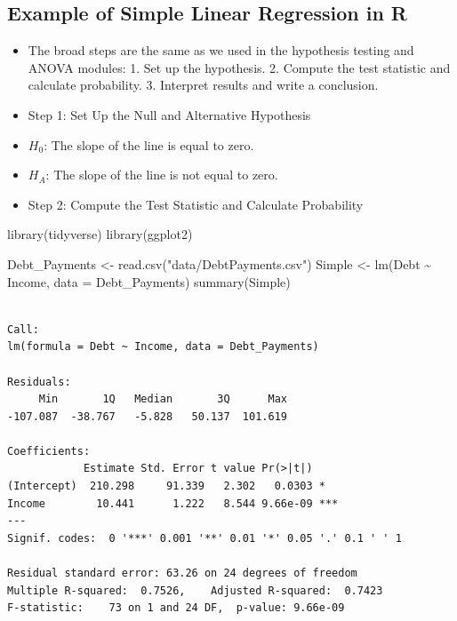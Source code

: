 \documentclass[
  letterpaper,
  DIV=11,
  numbers=noendperiod]{scrreprt}
\newenvironment{Shaded}{\begin{snugshade}}{\end{snugshade}}
\newcommand{\AttributeTok}[1]{\textcolor[rgb]{0.40,0.45,0.13}{#1}}
\newcommand{\FunctionTok}[1]{\textcolor[rgb]{0.28,0.35,0.67}{#1}}
\newcommand{\NormalTok}[1]{\textcolor[rgb]{0.00,0.23,0.31}{#1}}
\newcommand{\OtherTok}[1]{\textcolor[rgb]{0.00,0.23,0.31}{#1}}
\newcommand{\SpecialCharTok}[1]{\textcolor[rgb]{0.37,0.37,0.37}{#1}}
\newcommand{\StringTok}[1]{\textcolor[rgb]{0.13,0.47,0.30}{#1}}
\begin{document}
\subsection{Example of Simple Linear Regression in
R}\label{example-of-simple-linear-regression-in-r}

\begin{itemize}
\item
  The broad steps are the same as we used in the hypothesis testing and
  ANOVA modules: 1. Set up the hypothesis. 2. Compute the test statistic
  and calculate probability. 3. Interpret results and write a
  conclusion.
\item
  Step 1: Set Up the Null and Alternative Hypothesis
\item
  \(H_0\): The slope of the line is equal to zero.
\item
  \(H_A\): The slope of the line is not equal to zero.
\item
  Step 2: Compute the Test Statistic and Calculate Probability
\end{itemize}

\begin{Shaded}
\begin{Highlighting}[]
\FunctionTok{library}\NormalTok{(tidyverse)}
\FunctionTok{library}\NormalTok{(ggplot2)}
\end{Highlighting}
\end{Shaded}

\begin{Shaded}
\begin{Highlighting}[]
\NormalTok{Debt\_Payments }\OtherTok{\textless{}{-}} \FunctionTok{read.csv}\NormalTok{(}\StringTok{"data/DebtPayments.csv"}\NormalTok{)}
\NormalTok{Simple }\OtherTok{\textless{}{-}} \FunctionTok{lm}\NormalTok{(Debt }\SpecialCharTok{\textasciitilde{}}\NormalTok{ Income, }\AttributeTok{data =}\NormalTok{ Debt\_Payments)}
\FunctionTok{summary}\NormalTok{(Simple)}
\end{Highlighting}
\end{Shaded}

\begin{verbatim}

Call:
lm(formula = Debt ~ Income, data = Debt_Payments)

Residuals:
     Min       1Q   Median       3Q      Max 
-107.087  -38.767   -5.828   50.137  101.619 

Coefficients:
            Estimate Std. Error t value Pr(>|t|)    
(Intercept)  210.298     91.339   2.302   0.0303 *  
Income        10.441      1.222   8.544 9.66e-09 ***
---
Signif. codes:  0 '***' 0.001 '**' 0.01 '*' 0.05 '.' 0.1 ' ' 1

Residual standard error: 63.26 on 24 degrees of freedom
Multiple R-squared:  0.7526,    Adjusted R-squared:  0.7423 
F-statistic:    73 on 1 and 24 DF,  p-value: 9.66e-09
\end{verbatim}
\end{document}
